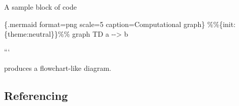 \documentclass[
]{article}
\newenvironment{Shaded}{}{}
\newcommand{\NormalTok}[1]{#1}
\newcommand{\1}{\boldsymbol{1}}
\begin{document}
A sample block of code

\begin{Shaded}
\begin{Highlighting}[]
\NormalTok{\textasciigrave{}\textasciigrave{}\textasciigrave{}\{.mermaid format=png scale=5 caption=\textquotesingle{}Computational graph\textquotesingle{}\}}
\NormalTok{\%\%\{init: \{\textquotesingle{}theme\textquotesingle{}:\textquotesingle{}neutral\textquotesingle{}\}\}\%\%}
\NormalTok{  graph TD}
\NormalTok{    a {-}{-}\textgreater{} b}
\end{Highlighting}
\end{Shaded}

```

produces a flowchart-like diagram.

\hypertarget{referencing}{%
\subsection{Referencing}\label{referencing}}
\end{document}
